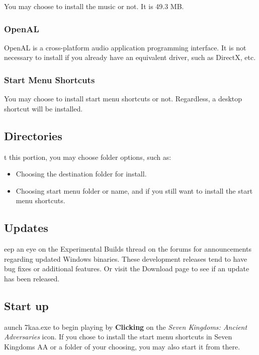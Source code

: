 You may choose to install the music or not. It is 49.3 MB.

\subsubsection{OpenAL}

OpenAL is a cross-platform audio application programming interface. It is not necessary to install if you already have an equivalent driver, such as DirectX, etc.

\subsubsection{Start Menu Shortcuts}

You may choose to install start menu shortcuts or not. Regardless, a desktop shortcut will be installed.  

\subsection{Directories}

t this portion, you may choose folder options, such as:

\begin{itemize}
	\item Choosing the destination folder for install.
	\item Choosing start menu folder or name, and if you still want to install the start menu shortcuts.
\end{itemize}

\subsection{Updates}

eep an eye on the Experimental Builds thread on the forums for announcements regarding updated Windows binaries. These development releases tend to have bug fixes or additional features. Or visit the Download page to see if an update has been released.

\subsection{Start up}


aunch 7kaa.exe to begin playing by \textbf{Clicking} on the \textit{Seven Kingdoms: Ancient Adversaries} icon. If you chose to install the start menu shortcuts in Seven Kingdoms AA or a folder of your choosing, you may also start it from there. \\ %

